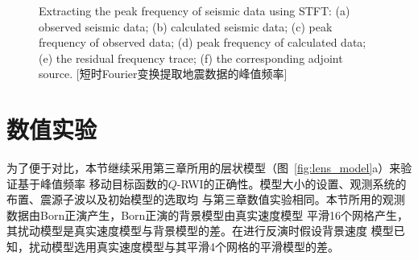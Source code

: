 \begin{figure}[!htbp]
	{Extracting the peak frequency of seismic data using STFT: (a) observed seismic data; 
	(b) calculated seismic data; (c) peak frequency of observed data; (d) peak frequency of 
	calculated data; (e) the residual frequency trace; (f) the corresponding adjoint source.}
    [短时Fourier变换提取地震数据的峰值频率]
    \label{fig:peak_frequency}
\end{figure}

\newpage
\vspace{0.5cm}
\section{数值实验}

为了便于对比，本节继续采用第三章所用的层状模型（图~\ref{fig:lens_model}a）来验证基于峰值频率
移动目标函数的$Q$-RWI的正确性。模型大小的设置、观测系统的布置、震源子波以及初始模型的选取均
与第三章数值实验相同。本节所用的观测数据由Born正演产生，Born正演的背景模型由真实速度模型
平滑16个网格产生，其扰动模型是真实速度模型与背景模型的差。在进行反演时假设背景速度
模型已知，扰动模型选用真实速度模型与其平滑4个网格的平滑模型的差。

